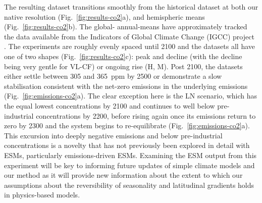The resulting dataset transitions smoothly from the historical dataset
at both our native resolution (Fig.~\ref{fig:results-co2}a),
and hemispheric means (Fig.~\ref{fig:results-co2}b).
The global- annual-means have approximately tracked
the data available from the Indicators of Global Climate Change (IGCC) project \citep{forster_igcc_2026}.
The experiments are roughly evenly spaced until 2100
and the datasets all have one of two shapes (Fig.~\ref{fig:results-co2}c):
peak and decline (with the decline being very gentle for VL-CF)
or ongoing rise (H, M).
Post 2100, the datasets either settle between 305 and 365~ppm by 2500
or demonstrate a slow stabilisation consistent with the net-zero emissions
in the underlying emissions (Fig.~\ref{fig:emissions-co2}a).
The clear exception here is the LN scenario,
which has the equal lowest concentrations by 2100
and continues to well below pre-industrial concentrations by 2200,
before rising again once its emissions return to zero by 2300
and the system begins to re-equilibrate (Fig.~\ref{fig:emissions-co2}a).
This excursion into deeply negative emissions and below pre-industrial concentrations
is a novelty that has not previously been explored in detail with ESMs,
particularly emissions-driven ESMs.
Examining the ESM output from this experiment
will be key to informing future updates of simple climate models
and our method as it will provide new information
about the extent to which our assumptions
about the reversibility of seasonality and latitudinal gradients holds in physics-based models.


